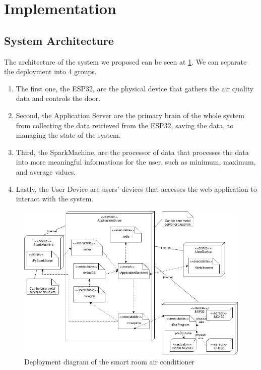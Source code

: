 \section{Implementation}

\subsection{System Architecture}

The architecture of the system we proposed can be seen at
\ref{system-architecture}.
We can separate the deployment into 4 groups.
\begin{enumerate}
      \item The first one, the ESP32, are the physical device
            that gathers the air quality data and controls the door.
      \item Second, the Application Server are the primary brain
            of the whole system from collecting the data
            retrieved from the ESP32, saving the data, to
            managing the state of the system.
      \item Third, the SparkMachine, are the processor of data
            that processes the data into more meaningful
            informations for the user, such as minimum, maximum,
            and average values.
      \item Lastly, the User Device are users' devices that
            accesses the web application to interact with the
            system.
\end{enumerate}

\begin{figure}
      \centerline{\includegraphics[scale=0.3]{resources/deployment-diagram.png}}
      \caption{Deployment diagram of the smart room air conditioner}
      \label{system-architecture}
\end{figure}

